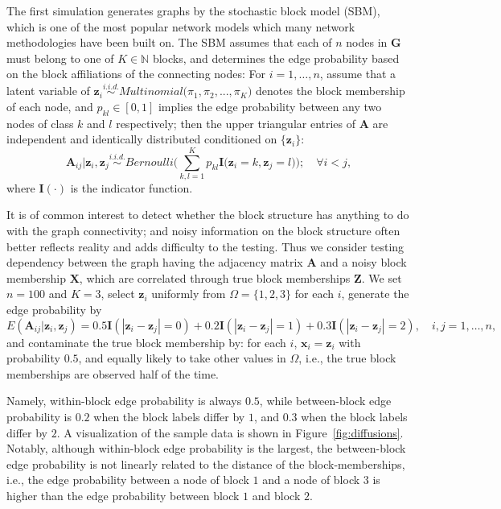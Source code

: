 \documentclass[11pt]{article}
\theoremstyle{definition}
\begin{document}
The first simulation generates graphs by the stochastic block model (SBM), which is one of the most popular network models which many network methodologies have been built on. The SBM assumes that each of $n$ nodes in $\mathbf{G}$ must belong to one of $K \in \mathbb{N}$ blocks, and determines the edge probability based on the block affiliations of the connecting nodes: For $i=1,\ldots,n$, assume that a latent variable of $\mathbf{z}_{i} \overset{i.i.d.}{\sim} Multinomial\big( \pi_{1}, \pi_{2}, ... , \pi_{K} \big)$ denotes the block membership of each node, and $p_{kl} \in [0,1]$ implies the edge probability between any two nodes of class $k$ and $l$ respectively; then the upper triangular entries of $\mathbf{A}$ are independent and identically distributed conditioned on $\{\mathbf{z}_{i}\}$:
\begin{equation} 
\mathbf{A}_{ij} \big| \mathbf{z}_{i}, \mathbf{z}_{j} \overset{i.i.d.}{\sim} Bernoulli\big( \sum\limits_{k,l=1}^{K} p_{kl} \mathbf{I} \big( \mathbf{z}_{i} = k, \mathbf{z}_{j} = l  \big)    \big); \quad \forall  i < j,
\end{equation}
where $\mathbf{I}(\cdot)$ is the indicator function. %

It is of common interest to detect whether the block structure has anything to do with the graph connectivity; and noisy information on the block structure often better reflects reality and adds difficulty to the testing. Thus we consider testing dependency between the graph having the adjacency matrix $\mathbf{A}$ and a noisy block membership $\mathbf{X}$, which are correlated through true block memberships $\mathbf{Z}$. We set $n=100$ and $K=3$, select $\mathbf{z}_i$ uniformly from $\Omega=\{1,2,3\}$ for each $i$, generate the edge probability by
\begin{equation}
\label{eq:Three}
E(\mathbf{A}_{ij} | \mathbf{z}_{i}, \mathbf{z}_{j}) = 0.5 \mathbf{I}(|\mathbf{z}_{i} - \mathbf{z}_{j}| = 0) + 0.2 \mathbf{I}(|\mathbf{z}_{i} - \mathbf{z}_{j}| = 1) + 0.3 \mathbf{I}(|\mathbf{z}_{i} - \mathbf{z}_{j}| = 2), \quad i,j = 1, \ldots, n,
\end{equation} 
and contaminate the true block membership by: for each $i$, $\mathbf{x}_{i}=\mathbf{z}_{i}$ with probability $0.5$, and equally likely to take other values in $\Omega$, i.e., the true block memberships are observed half of the time.

Namely, within-block edge probability is always $0.5$, while between-block edge probability is $0.2$ when the block labels differ by $1$, and $0.3$ when the block labels differ by $2$. A visualization of the sample data is shown in Figure~\ref{fig:diffusions}. 
Notably, although within-block edge probability is the largest, the between-block edge probability is not linearly related to the distance of the block-memberships, i.e., the edge probability between a node of block $1$ and a node of block $3$ is higher than the edge probability between block $1$ and block $2$. 
\end{document}
